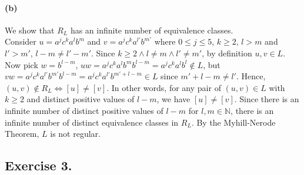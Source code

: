 \documentclass[12pt]{article}
\begin{document}
\paragraph*{(b)} We show that \(R_L\) has an infinite number of equivalence classes. \\
Consider \(u = a^jc^ka^lb^m\) and \(v = a^jc^ka^{l'}b^{m'}\) where \(0 \leq j \leq 5\), \(k \geq 2\), \(l > m\) and \(l' > m'\), \(l - m \neq l' - m'\). Since \(k \geq 2 \land l \neq m \land l' \neq m'\), by definition \(u, v \in L\). Now pick \(w = b^{l-m}\), \(uw = a^jc^ka^lb^mb^{l-m} = a^jc^ka^lb^l \notin L\), but \(vw = a^jc^ka^{l'}b^{m'}b^{l-m} = a^jc^ka^{l'}b^{m'+l-m} \in L\) since \(m'+l-m \neq l'\). Hence, \((u, v) \notin R_L \Leftrightarrow [u] \neq [v]\). In other words, for any pair of \((u, v) \in L\) with \(k \geq 2\) and distinct positive values of \(l-m\), we have \([u] \neq [v]\). Since there is an infinite number of distinct positive values of \(l-m\) for \(l, m \in \mathbb{N}\), there is an infinite number of distinct equivalence classes in \(R_L\). By the Myhill-Nerode Theorem, \(L\) is not regular.

\subsection*{Exercise 3.}
\end{document}
